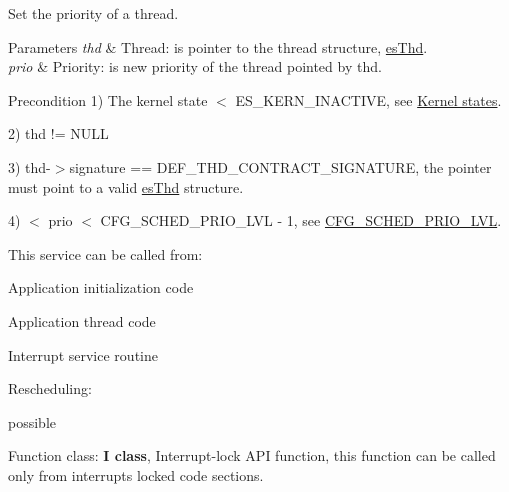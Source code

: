 Set the priority of a thread. 


\begin{DoxyParams}{Parameters}
{\em thd} & Thread\-: is pointer to the thread structure, \hyperlink{structesThd}{es\-Thd}. \\
\hline
{\em prio} & Priority\-: is new priority of the thread pointed by {\ttfamily thd}. \\
\hline
\end{DoxyParams}
\begin{DoxyPrecond}{Precondition}
1) {\ttfamily The kernel state $<$ E\-S\-\_\-\-K\-E\-R\-N\-\_\-\-I\-N\-A\-C\-T\-I\-V\-E}, see \hyperlink{states}{Kernel states}. 

2) {\ttfamily thd != N\-U\-L\-L} 

3) {\ttfamily thd-\/$>$signature == D\-E\-F\-\_\-\-T\-H\-D\-\_\-\-C\-O\-N\-T\-R\-A\-C\-T\-\_\-\-S\-I\-G\-N\-A\-T\-U\-R\-E}, the pointer must point to a valid \hyperlink{structesThd}{es\-Thd} structure. 

4) { $<$ prio $<$ C\-F\-G\-\_\-\-S\-C\-H\-E\-D\-\_\-\-P\-R\-I\-O\-\_\-\-L\-V\-L -\/ 1}, see \hyperlink{group__template__kern__cfg_ga56bd89fe76f7fe22f3d8805bc3c68892}{C\-F\-G\-\_\-\-S\-C\-H\-E\-D\-\_\-\-P\-R\-I\-O\-\_\-\-L\-V\-L}. 
\end{DoxyPrecond}
\begin{DoxyParagraph}{This service can be called from\-:}

\begin{DoxyItemize}
\item Application initialization code
\item Application thread code
\item Interrupt service routine 
\end{DoxyItemize}
\end{DoxyParagraph}
\begin{DoxyParagraph}{Rescheduling\-:}

\begin{DoxyItemize}
\item possible 
\end{DoxyItemize}
\end{DoxyParagraph}
\begin{DoxyParagraph}{Function class\-:}
{\bfseries I class}, Interrupt-\/lock A\-P\-I function, this function can be called only from interrupts locked code sections. 
\end{DoxyParagraph}
